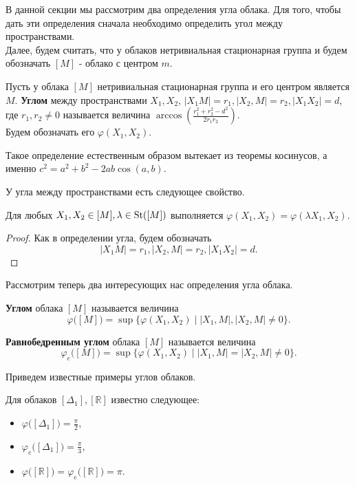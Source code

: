 В данной секции мы рассмотрим два определения угла облака. Для того, чтобы дать эти определения сначала необходимо определить угол между пространствами. 
\\
Далее, будем считать, что у облаков нетривиальная стационарная группа и будем обозначать $ [M] $ - облако с центром $ m $.
\begin{defin}
    Пусть у облака $ [M] $ нетривиальная стационарная группа и его центром является $ M $. \textbf{Углом} между пространствами $ X_1, X_2 $, $ |X_1 M| = r_1, | X_2, M | =r_2, |X_1 X_2| = d$, где $ r_1, r_2 \neq 0 $ называется величина $ \arccos \left(\frac{r_1^2 + r_{2}^2 - d^2}{2r_1r_2} \right)$.\\ Будем обозначать его $ \varphi(X_1, X_2) $.
\end{defin}
\begin{remark}
    Такое определение естественным образом вытекает из теоремы косинусов, а именно $ c^{2} = a^2 + b^2 - 2ab\cos (a,b) $.
\end{remark}
У угла между пространствами есть следующее свойство.
\begin{lemma}
    Для любых \( X_1, X_2 \in [M], \lambda \in \operatorname{St}([M]) \) выполняется \( \varphi (X_1, X_2) = \varphi (\lambda X_1, X_2) \).
\end{lemma} 
\begin{proof}
    Как в определении угла, будем обозначать \[ |X_1 M| = r_1, | X_2, M | =r_2, |X_1 X_2| = d.\] 
\end{proof}
Рассмотрим теперь два интересующих нас определения угла облака.
\begin{defin}
\textbf{Углом} облака $ [M] $ называется величина
\[
    \varphi \big([M]\big)= \sup \big\{\varphi (X_1, X_2) \mid | X_1,M |, |X_2,M| \neq 0\big\}.
\]
\end{defin}
\begin{defin}
    \textbf{Равнобедренным углом} облака $ [M] $ называется величина \[ \varphi_e \big([M]\big) = \sup \big\{\varphi (X_1, X_2) \mid | X_1,M | = |X_2,M| \neq 0\big\}. \]
\end{defin}
Приведем известные примеры углов облаков.
\begin{lemma}
    Для облаков \( [\Delta _{1}], [\mathbb{R}] \) известно следующее:
    \begin{itemize}
    \item \( \varphi \big([\Delta _{1}]\big) = \frac{\pi }{2} \),
    \item \( \varphi_e \big([\Delta _{1}]\big) = \frac{\pi }{3} \),
    \item \( \varphi \big([\mathbb{R}]\big) = \varphi_e \big([\mathbb{R}]\big) = \pi  \).
    \end{itemize}
\end{lemma}
